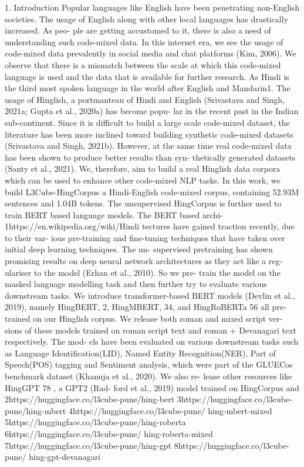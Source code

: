 1. Introduction Popular languages like English have been penetrating non-English societies. The usage of English along with other local languages has drastically increased. As peo- ple are getting accustomed to it, there is also a need of understanding such code-mixed data. In this internet era, we see the usage of code-mixed data prevalently in social media and chat platforms (Kim, 2006). We observe that there is a mismatch between the scale at which this code-mixed language is used and the data that is available for further research. As Hindi is the third most spoken language in the world after English and Mandarin1. The usage of Hinglish, a portmanteau of Hindi and English (Srivastava and Singh, 2021a; Gupta et al., 2020a) has become popu- lar in the recent past in the Indian sub-continent. Since it is difficult to build a large scale code-mixed dataset, the literature has been more inclined toward building synthetic code-mixed datasets (Srivastava and Singh, 2021b). However, at the same time real code-mixed data has been shown to produce better results than syn- thetically generated datasets (Santy et al., 2021). We, therefore, aim to build a real Hinglish data corpora which can be used to enhance other code-mixed NLP tasks. In this work, we build L3Cube-HingCorpus a Hindi-English code-mixed corpus, containing 52.93M sentences and 1.04B tokens. The unsupervised HingCorpus is further used to train BERT based language models. The BERT based archi- 1https://en.wikipedia.org/wiki/Hindi tectures have gained traction recently, due to their var- ious pre-training and fine-tuning techniques that have taken over initial deep learning techniques. The un- supervised pretraining has shown promising results on deep neural network architectures as they act like a reg- ulariser to the model (Erhan et al., 2010). So we pre- train the model on the masked language modelling task and then further try to evaluate various downstream tasks. We introduce transformer-based BERT models (Devlin et al., 2019), namely HingBERT, 2, HingMBERT, 34, and HingRoBERTa 56 all pre-trained on our Hinglish corpus. We release both roman and mixed script ver- sions of these models trained on roman script text and roman + Devanagari text respectively. The mod- els have been evaluated on various downstream tasks such as Language Identification(LID), Named Entity Recognition(NER), Part of Speech(POS) tagging and Sentiment analysis, which were part of the GLUECos benchmark dataset (Khanuja et al., 2020). We also re- lease other resources like HingGPT 78 , a GPT2 (Rad- ford et al., 2019) model trained on HingCorpus and 2https://huggingface.co/l3cube-pune/hing-bert 3https://huggingface.co/l3cube-pune/hing-mbert 4https://huggingface.co/l3cube-pune/ hing-mbert-mixed 5https://huggingface.co/l3cube-pune/hing-roberta 6https://huggingface.co/l3cube-pune/ hing-roberta-mixed 7https://huggingface.co/l3cube-pune/hing-gpt 8https://huggingface.co/l3cube-pune/ hing-gpt-devanagari

